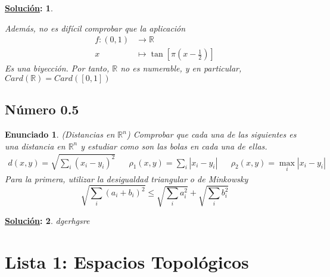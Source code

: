 \documentclass[10pt,a4paper,openright]{book}
\theoremstyle{break}
\newtheorem*{enun}{Enunciado}
\newtheorem*{sol}{\underline{Solución}:}
\begin{document}
\begin{sol}
\begin{enumerate}[label={(\arabic*)}]
Además, no es difícil comprobar que la aplicación 
\begin{align*}
f: (0,1) &\rightarrow \mathbb{R} \\
x &\mapsto \tan\left[\pi (x - \frac{1}{2})\right]
\end{align*}
Es una biyección. Por tanto, $\mathbb{R}$ no es numerable, y en particular, $Card(\mathbb{R}) = Card([0,1])$
\end{enumerate}

\end{sol}

\section{Número 0.5}
\begin{enun}
(Distancias en $\mathbb{R}^n$) Comprobar que cada una de las siguientes es una distancia en $\mathbb{R}^n$ y estudiar como son las bolas en cada una de ellas.
\begin{align*}
d(x,y) = \sqrt{\sum_i (x_i - y_i)^2} && \rho_1(x,y) = \sum_i | x_i - y_i| && \rho_2 (x,y) = \max_i |x_i -y_i|
\end{align*}
Para la primera, utilizar la \textit{desigualdad triangular} o \textit{de Minkowsky} $$\sqrt{\sum_i (a_i + b_i)^2} \leq \sqrt{\sum_i a_i^2} + \sqrt{\sum_i b_i^2}$$
\end{enun}
\begin{sol}
dgerhgsre
\end{sol}
\chapter{Lista 1: Espacios Topológicos}%
\label{cha:lista1}
\end{document}
